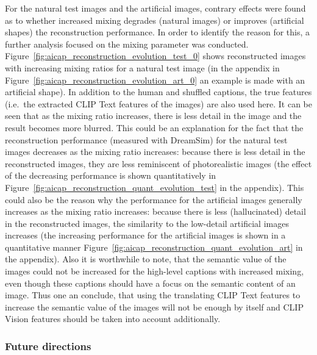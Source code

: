 For the natural test images and the artificial images, contrary effects were found as to whether increased mixing degrades (natural images) or improves (artificial shapes) the reconstruction performance. In order to identify the reason for this, a further analysis focused on the mixing parameter was conducted. Figure~\ref{fig:aicap_reconstruction_evolution_test_0} shows reconstructed images with increasing mixing ratios for a natural test image (in the appendix in Figure~\ref{fig:aicap_reconstruction_evolution_art_0} an example is made with an artificial shape). In addition to the human and shuffled captions, the true features (i.e.\ the extracted CLIP Text features of the images) are also used here. It can be seen that as the mixing ratio increases, there is less detail in the image and the result becomes more blurred. This could be an explanation for the fact that the reconstruction performance (measured with DreamSim) for the natural test images decreases as the mixing ratio increases: because there is less detail in the reconstructed images, they are less reminiscent of photorealistic images (the effect of the decreasing performance is shown quantitatively in Figure~\ref{fig:aicap_reconstruction_quant_evolution_test} in the appendix). This could also be the reason why the performance for the artificial images generally increases as the mixing ratio increases: because there is less (hallucinated) detail in the reconstructed images, the similarity to the low-detail artificial images increases (the increasing performance for the artificial images is shown in a quantitative manner Figure~\ref{fig:aicap_reconstruction_quant_evolution_art} in the appendix).  Also it is worthwhile to note, that the semantic value of the images could not be increased for the high-level captions with increased mixing, even though these captions should have a focus on the semantic content of an image. Thus one an conclude, that using the translating CLIP Text features to increase the semantic value of the images will not be enough by itself and CLIP Vision features should be taken into account additionally.

\subsubsection{Future directions}

